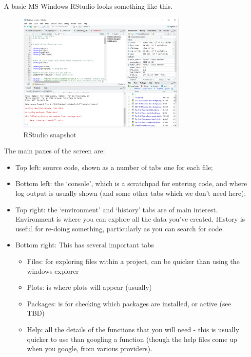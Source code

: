 \documentclass[
]{book}
\providecommand{\tightlist}{%
  \setlength{\itemsep}{0pt}\setlength{\parskip}{0pt}}
\begin{document}
A basic MS Windows RStudio looks something like this.

\begin{figure}
\centering
\includegraphics[width=0.75\textwidth,height=\textheight]{images/RStudio.png}
\caption{RStudio snapshot}
\end{figure}

The main panes of the screen are:

\begin{itemize}
\tightlist
\item
  Top left: source code, shown as a number of tabs one for each file;
\item
  Bottom left: the `console', which is a scratchpad for entering code, and where log output is usually shown (and some other tabs which we don't need here);
\item
  Top right: the `environment' and `history' tabs are of main interest. Environment is where you can explore all the data you've created. History is useful for re-doing something, particularly as you can search for code.
\item
  Bottom right: This has several important tabs

  \begin{itemize}
  \tightlist
  \item
    Files: for exploring files within a project, can be quicker than using the windows explorer
  \item
    Plots: is where plots will appear (usually)
  \item
    Packages: is for checking which packages are installed, or active (see TBD)
  \item
    Help: all the details of the functions that you will need - this is usually quicker to use than googling a function (though the help files come up when you google, from various providers).
  \end{itemize}
\end{itemize}
\end{document}
